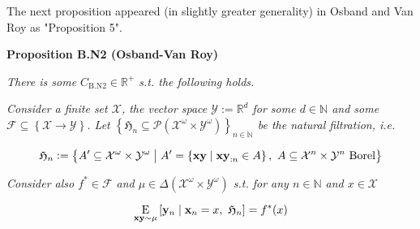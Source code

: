 \documentclass[a4paper]{article}
\newcommand{\Co}[1]{}
\DeclareMathOperator{\Supp}{supp}
\newcommand{\AP}[1]{\left(#1\right)}
\newcommand{\AC}[1]{\left\{#1\right\}}
\newcommand{\ABM}[2]{\left[#1\;\middle\vert\;#2\right]}
\newcommand{\ACM}[2]{\left\{#1\;\middle\vert\;#2\right\}}
\newcommand{\E}[1]{\underset{#1}{\operatorname{E}}}
\newcommand{\CE}[3]{\underset{#1}{\operatorname{E}}\ABM{#2}{#3}}
\newcommand{\PS}[1]{\mathcal{P}\AP{#1}}
\newcommand{\D}{\mathrm{d}}
\newcommand{\Nats}{\mathbb{N}}
\newcommand{\Reals}{\mathbb{R}}
\newcommand{\Abs}[1]{\left\vert #1 \right\vert}
\newcommand{\K}{\xrightarrow{\mathrm{k}}}
\newcommand{\X}{\mathcal{X}}
\newcommand{\Y}{\mathcal{Y}}
\newcommand{\F}{\mathcal{F}}
\newcommand{\A}{\mathcal{A}}
\newcommand{\V}{\mathrm{V}}
\newcommand{\EU}{\mathrm{EU}}
\begin{document}
\Co{...

\textbf{Proposition B.N3}\Co{b}

Consider some $\gamma\in(0,1)$, $\tau\in(0,\infty)$, $T\in\Nats^+$, a universe..., some $\pi^*: ? \rightarrow \A$ and some $\pi^0: ? \K \A$. Assume that $\gamma \geq \gamma_M$. For any $n \in \Nats$, let $\pi^*_n$ be a policy s.t. for any $h \in ?$

$$\pi^*_n(h):=\begin{cases} \pi^0(h) \text{ if } \Abs{h} < nT \\ \pi^*(h) \text{ otherwise} \end{cases}$$

Assume that for any $h \in ?$

i. $$\pi^*(s) \in \A_{M}^\omega\AP{S(h)}$$

ii. $$\Supp{\pi^0(h)} \subseteq \A_{M}^0\AP{S(h)}$$

iii. For any $\theta\in(\gamma,1)$ $$\Abs{\frac{\D\V_{M}\AP{S(h),\theta}}{\D\theta}} \leq \tau$$

Then

$$\EU^{*}_\upsilon(\gamma)-\EU^{\pi^0}_\upsilon(\gamma) \leq (1-\gamma)\sum_{n=0}^\infty \sum_{m=0}^{T-1} \gamma^{nT+m}\left(\E{x\sim\mu\bowtie\pi^*_n}\left[r\left(x_{:nT+m}\right)\right]-\E{x\sim\mu\bowtie\pi^0}\left[r\left(x_{:nT+m}\right)\right]\right) + \frac{2\tau\gamma^T(1-\gamma)}{1-\gamma^T}$$}

The next proposition appeared (in slightly greater generality) in Osband and Van Roy as "Proposition 5".

\textbf{Proposition B.N2 (Osband-Van Roy)}\Co{b}

\textit{There is some $C_{\mathrm{B.N2}}\in\Reals^+$ s.t. the following holds.}\Co{i}

\textit{Consider a finite set $\X$, the vector space $\Y:=\Reals^d$ for some $d\in\Nats$ and some $\F\subseteq\AC{\X\rightarrow\Y}$. Let $\AC{\mathfrak{H}_n\subseteq\PS{\X^\omega\times\Y^\omega}}_{n\in\Nats}$ be the natural filtration, i.e.}\Co{i}

$$\mathfrak{H}_n:=\ACM{A'\subseteq\X^\omega\times\Y^\omega}{A'=\ACM{\bold{xy}}{\bold{xy}_{:n}\in A},\ A\subseteq\X^n\times\Y^n\text{ Borel}}$$

\textit{Consider also $f^*\in\F$ and $\mu\in\Delta\AP{\X^\omega\times\Y^\omega}$ s.t. for any $n\in\Nats$ and $x\in\X$}\Co{i}

$$\CE{\bold{xy}\sim\mu}{\bold{y}_n}{\bold{x}_n=x,\ \mathfrak{H}_n} = f^*(x)$$
\end{document}

